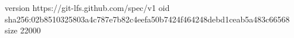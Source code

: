 version https://git-lfs.github.com/spec/v1
oid sha256:02b8510325803a4c787e7b82c4eefa50b7424f464248debd1ceab5a483c66568
size 22000
